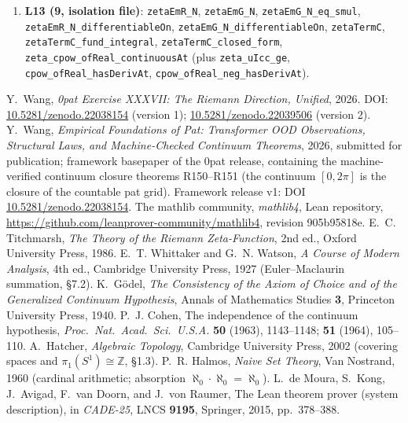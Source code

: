 \documentclass{article}
\begin{document}
{\begin{sloppypar}
\begin{enumerate}
\texttt{zeta\_line\_two\_bounded}, \texttt{Gamma\_one\_add\_it\_norm\_le\_one},
\texttt{zeta\_ne\_zero\_on\_bottom\_edge}, \texttt{zeta\_im\_zero\_on\_real},
\texttt{zeta\_neg\_one\_re\_neg}, \texttt{bottom\_edge\_arg\_jump},
\texttt{zeta\_partial\_sum\_lt\_integral\_bound}.
\item \textbf{L13 (9, isolation file)}: \texttt{zetaEmR\_N},
\texttt{zetaEmG\_N}, \texttt{zetaEmG\_N\_eq\_smul},
\texttt{zetaEmR\_N\_differentiableOn}, \texttt{zetaEmG\_N\_differentiableOn},
\texttt{zetaTermC}, \texttt{zetaTermC\_fund\_integral},
\texttt{zetaTermC\_closed\_form}, \texttt{zeta\_cpow\_ofReal\_continuousAt}
(plus \texttt{zeta\_uIcc\_ge}, \texttt{cpow\_ofReal\_hasDerivAt},
\texttt{cpow\_ofReal\_neg\_hasDerivAt}).
\end{enumerate}
\end{sloppypar}}

\begin{thebibliography}{9}
Y.~Wang, \emph{0pat Exercise XXXVII: The Riemann Direction, Unified},
2026. DOI:
\href{https://doi.org/10.5281/zenodo.22038154}{10.5281/zenodo.22038154}
(version 1); \href{https://doi.org/10.5281/zenodo.22039506}{10.5281/zenodo.22039506} (version 2).
Y.~Wang, \emph{Empirical Foundations of Pat: Transformer OOD Observations,
Structural Laws, and Machine-Checked Continuum Theorems}, 2026, submitted
for publication; framework basepaper of the 0pat release, containing the
machine-verified continuum closure theorems R150--R151 (the continuum
$[0,2\pi]$ is the closure of the countable pat grid). Framework release
v1: DOI
\href{https://doi.org/10.5281/zenodo.22038154}{10.5281/zenodo.22038154}.
The mathlib community, \emph{mathlib4}, Lean repository,
\url{https://github.com/leanprover-community/mathlib4}, revision 905b95818e.
E.~C. Titchmarsh, \emph{The Theory of the Riemann Zeta-Function}, 2nd ed.,
Oxford University Press, 1986.
E.~T. Whittaker and G.~N. Watson, \emph{A Course of Modern Analysis}, 4th ed.,
Cambridge University Press, 1927 (Euler--Maclaurin summation, \S7.2).
K.~G\"odel, \emph{The Consistency of the Axiom of Choice and of the
Generalized Continuum Hypothesis}, Annals of Mathematics Studies \textbf{3},
Princeton University Press, 1940.
P.~J. Cohen, The independence of the continuum hypothesis,
\emph{Proc.\ Nat.\ Acad.\ Sci.\ U.S.A.} \textbf{50} (1963), 1143--1148;
\textbf{51} (1964), 105--110.
A.~Hatcher, \emph{Algebraic Topology}, Cambridge University Press, 2002
(covering spaces and $\pi_1(S^1)\cong\mathbb Z$, \S1.3).
P.~R. Halmos, \emph{Naive Set Theory}, Van Nostrand, 1960
(cardinal arithmetic; absorption $\aleph_0\cdot\aleph_0=\aleph_0$).
L.~de Moura, S.~Kong, J.~Avigad, F.~van Doorn, and J.~von Raumer,
The Lean theorem prover (system description), in \emph{CADE-25},
LNCS \textbf{9195}, Springer, 2015, pp.~378--388.
\end{thebibliography}
\end{document}
